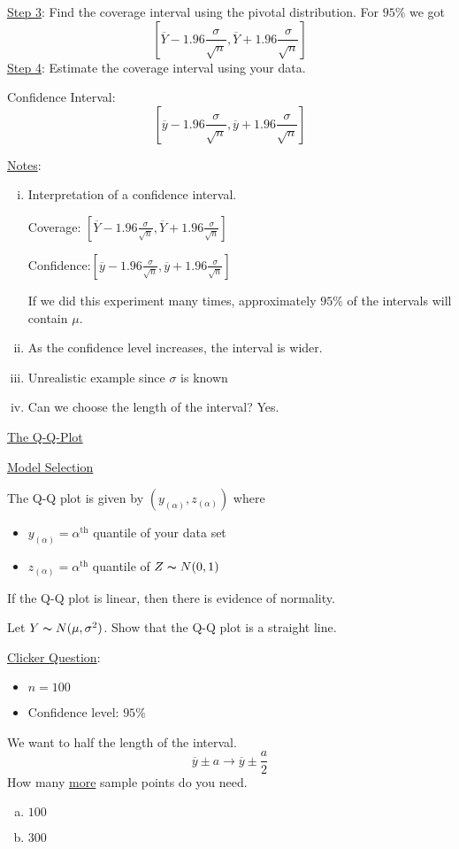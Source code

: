 \underline{Step 3}: Find the coverage interval using the pivotal distribution.
For $ 95\% $ we got
\[ \left[ \overline{Y}-1.96\frac{\sigma}{\sqrt{n}},
        \overline{Y}+1.96\frac{\sigma}{\sqrt{n}}\right] \] \underline{Step 4}: Estimate
the coverage interval using your data.

Confidence Interval:
\[ \left[ \overline{y}-1.96\frac{\sigma}{\sqrt{n}},
        \overline{y}+1.96\frac{\sigma}{\sqrt{n}}\right] \]

\underline{Notes}:
\begin{enumerate}[(i)]
    \item Interpretation of a confidence interval.

          Coverage: $ \left[ \overline{Y}-1.96\frac{\sigma}{\sqrt{n}},
                  \overline{Y}+1.96\frac{\sigma}{\sqrt{n}}\right] $

          Confidence:$ \left[ \overline{y}-1.96\frac{\sigma}{\sqrt{n}},
                  \overline{y}+1.96\frac{\sigma}{\sqrt{n}}\right] $

          If we did this experiment many times, approximately $ 95\% $ of the
          intervals will contain $ \mu $.

    \item As the confidence level increases, the interval is wider.
    \item Unrealistic example since $ \sigma $ is known
    \item Can we choose the length of the interval? Yes.
\end{enumerate}

\underline{The Q-Q-Plot}

\underline{Model Selection}

The Q-Q plot is given by $ (y_{(\alpha)},z_{(\alpha)}) $ where
\begin{itemize}
    \item $ y_{(\alpha)} = \alpha^{\text{th}} $ quantile of your data set
    \item $ z_{(\alpha)} = \alpha^{\text{th}}  $ quantile of $ Z \thicksim
              N(0,1) $
\end{itemize}
If the Q-Q plot is linear, then there is evidence of normality.

Let $ Y \thicksim N(\mu,\sigma^2) $. Show that the Q-Q plot is a straight line.

\underline{Clicker Question}:
\begin{itemize}
    \item $ n=100 $
    \item Confidence level: $ 95\% $
\end{itemize}
We want to half the length of the interval.
\[ \overline{y}\pm a\rightarrow \overline{y}\pm \frac{a}{2} \] How many
\underline{more} sample points do you need.
\begin{enumerate}[(a)]
    \item $ 100 $
    \item $ 300 $
\end{enumerate}
